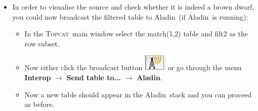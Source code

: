 \documentclass [a4paper, 12pt]{article}
\newcommand{\aladin}{{\textsc{A}{ladin}}}
\newcommand{\topcat}{{\textsc{Topcat}}}
\begin{document}
\begin{itemize}
\begin{figure}[H]
        \caption{Subset of the cross-matched 2MASS PSC/ SDSS DR9 tables in 
            \topcat. }
        \label{fig:filtering_topcat}
    \end{figure}
    \item In order to visualise the source and check whether it is indeed a 
    brown dwarf, you could now broadcast the filtered table to \aladin\ (if 
    \aladin\ is running):
    \begin{itemize}
        \item In the \topcat\ main window select the match(1,2) table and filt2 
        as the row subset. 
        \item Now either click the broadcast button 
        \includegraphics[width=0.04        
        \textwidth]{../images/topcat_button_broadcast.jpg} or go through the 
        menu 
        \textbf{Interop} $\rightarrow$ \textbf{Send table to... } $\rightarrow$ 
        \textbf{Aladin}. 
        \item Now a new table should appear in the \aladin\ stack and you can 
        proceed as before. 
    \end{itemize}
\end{itemize}
\end{document}
